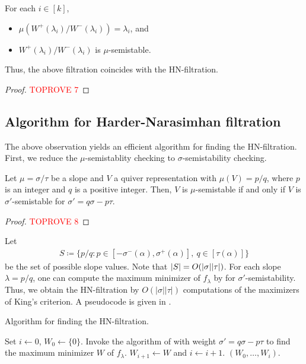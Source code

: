 \documentclass[a4paper,11pt]{article}
\numberwithin{equation}{section}
\DeclarePairedDelimiter{\abs}{\lvert}{\rvert}
\begin{document}
\begin{theorem}
    For each $i \in [k]$,
    \begin{itemize}
        \item $\mu(W^+(\lambda_i) / W^-(\lambda_i)) = \lambda_i$, and
        \item $W^+(\lambda_i) / W^-(\lambda_i)$ is $\mu$-semistable.
    \end{itemize}
    Thus, the above filtration coincides with the HN-filtration.
\end{theorem}
\begin{proof}\textcolor{red}{TOPROVE 7}\end{proof}

\subsection{Algorithm for Harder-Narasimhan filtration}
The above observation yields an efficient algorithm for finding the HN-filtration.
First, we reduce the $\mu$-semistablity checking to $\sigma$-semistability checking.

\begin{lemma}\label{lem:slope-to-weight}
    Let $\mu = \sigma/\tau$ be a slope and $V$ a quiver representation with $\mu(V) = p/q$, where $p$ is an integer and $q$ is a positive integer.
    Then, $V$ is $\mu$-semistable if and only if $V$ is $\sigma'$-semistable for $\sigma' = q\sigma - p \tau$.
\end{lemma}
\begin{proof}\textcolor{red}{TOPROVE 8}\end{proof}

Let 
\begin{align}
    S \coloneqq \{ p / q : p \in [-\sigma^-(\alpha), \sigma^+(\alpha)],\ q \in [\tau(\alpha)] \}
\end{align}
be the set of possible slope values.
Note that $\abs{S} = O(|\sigma||\tau|)$.
For each slope $\lambda = p/q$, one can compute the maximum minimizer of $f_\lambda$ by  for $\sigma'$-semistability.
Thus, we obtain the HN-filtration by $O(|\sigma||\tau|)$ computations of the maximizers of King's criterion.
A pseudocode is given in .

\begin{algorithm}
    \caption{Algorithm for finding the HN-filtration.\label{alg:HN}}
\begin{algorithmic}[1]
    \State Set $i \gets 0$, $W_0 \gets \{0\}$.
    \State Invoke the algorithm of  with weight $\sigma' = q\sigma - p \tau$ to find the maximum minimizer $W$ of $f_\lambda$.
    \State $W_{i+1} \gets W$ and $i \gets i + 1$.
    \EndIf
    \EndFor
    \State \Return $(W_0, \dots, W_i)$.
\end{algorithmic}
\end{algorithm}
\end{document}
